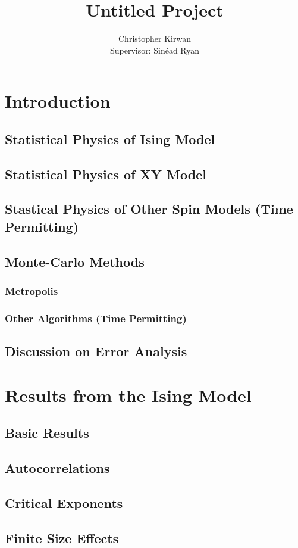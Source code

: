 \documentclass[a4paper,notitlepage]{report}
\title{Untitled Project}
\author{Christopher Kirwan \qquad 17325310 \\ Supervisor: Sinéad Ryan}
\begin{document}


\tableofcontents

\chapter{Introduction}
	\section{Statistical Physics of Ising Model}
	\section{Statistical Physics of XY Model}
	\section{Stastical Physics of Other Spin Models (Time Permitting)}
	\section{Monte-Carlo Methods}
		\subsection{Metropolis}
		\subsection{Other Algorithms (Time Permitting)}
	\section{Discussion on Error Analysis}
\chapter{Results from the Ising Model}
	\section{Basic Results}
	\section{Autocorrelations}
	\section{Critical Exponents}
	\section{Finite Size Effects}
\end{document}
